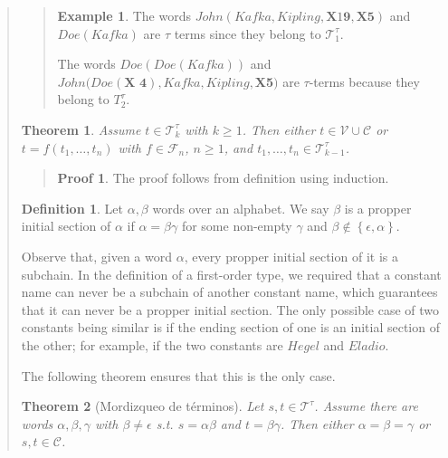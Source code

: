 \documentclass[a4paper, 12pt]{article}
\newtheorem{theorem}{Theorem}
\theoremstyle{definition}
\theoremstyle{definition}
\newtheorem{example}{Example}
\theoremstyle{definition}
\newtheorem{definition}{Definition}
\newtheorem{pro}{Proof}
\begin{document}
\begin{quote}
\begin{quote}
\begin{example}
    The words $John(Kafka, Kipling, \textbf{X}\textit{1}\textbf{9},
    \textbf{X5})$ and $Doe(Kafka)$ are $\tau$ terms since they belong to
    $\mathcal{T}_1^{\tau}$.

    The words $Doe \left( Doe \left( Kafka \right)  \right) $ and $John (
    Doe(\textbf{X 4}), Kafka, Kipling, $\textbf{X5}$) $ are $\tau$-terms
    because they belong to $T_2^{\tau}$.
\end{example}

\end{quote}
\normalsize


\begin{theorem}
    Assume $t \in \mathcal{T}_k^\tau$ with $k\geq 1$. Then either 
    $t \in \mathcal{V} \cup \mathcal{C}$ or 
    $t = f(t_1, \ldots, t_n)$ with $f \in \mathcal{F}_n$, $n \geq 1$,
    and $t_1,\ldots, t_n \in \mathcal{T}_{k-1}^\tau$.
\end{theorem}


\small
\begin{quote}

\begin{pro}
    The proof follows from definition using induction.
\end{pro}

\end{quote}
\normalsize

\begin{definition}
    Let $\alpha, \beta$ words over an alphabet. We say $\beta$ is a propper initial section
    of $\alpha$ if $\alpha = \beta \gamma$ for some non-empty $\gamma$ and 
    $\beta \not\in \left\{ \epsilon, \alpha \right\} $.
\end{definition}

Observe that, given a word $\alpha$, every propper initial section of it is a
subchain. In the definition of a first-order type, we required that a constant
name can never be a subchain of another constant name, which guarantees that it
can never be a propper initial section. The only possible case of two constants
being similar is if the ending section of one is an initial section of the
other; for example, if the two constants are $Hegel$ and $Eladio$.

The following theorem ensures that this is the only case.

\begin{theorem}[Mordizqueo de términos]
    Let $s, t \in \mathcal{T}^\tau$. Assume there are words 
    $\alpha, \beta, \gamma$ with $\beta \neq \epsilon$ s.t. 
    $s = \alpha\beta$ and $t = \beta \gamma$.
    Then either $\alpha = \beta = \gamma$ or 
    $s, t \in \mathcal{C}$.
\end{theorem}



\end{quote}
\end{document}

